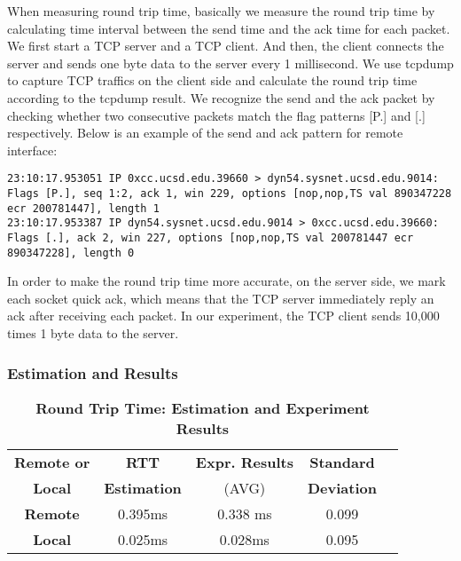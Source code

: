 When measuring round trip time, basically we measure the round trip time by calculating time interval between the send time and the ack time for each packet. We first start a TCP server and a TCP client. And then, the client connects the server and sends one byte data to the server every 1 millisecond. We use tcpdump to capture TCP traffics on the client side and calculate the round trip time according to the tcpdump result.  We recognize the send and the ack packet by checking whether two consecutive packets match the flag patterns [P.] and [.] respectively. Below is an example of the send and ack pattern for remote interface:

\begin{lstlisting}
23:10:17.953051 IP 0xcc.ucsd.edu.39660 > dyn54.sysnet.ucsd.edu.9014: Flags [P.], seq 1:2, ack 1, win 229, options [nop,nop,TS val 890347228 ecr 200781447], length 1
23:10:17.953387 IP dyn54.sysnet.ucsd.edu.9014 > 0xcc.ucsd.edu.39660: Flags [.], ack 2, win 227, options [nop,nop,TS val 200781447 ecr 890347228], length 0
\end{lstlisting}

In order to make the round trip time more accurate, on the server side, we mark each socket quick ack, which means that the TCP server immediately reply an ack after receiving each packet. In our experiment, the TCP client sends 10,000 times 1 byte data to the server.

\subsubsection{Estimation and Results}

\begin{table}[ht]
  \centering
  \caption{\textbf{Round Trip Time: Estimation and Experiment Results}}
  \begin{threeparttable}
  \begin{tabular}{ccccc}
  \hline
      \textbf{Remote or} & \textbf{RTT}   & \textbf{Expr. Results} & \textbf{Standard}\\
      \textbf{Local}   &  \textbf{Estimation}  & (AVG)   & \textbf{Deviation} \\
  \hline
      \textbf{Remote}  & 0.395ms & 0.338 ms & 0.099 \\
      \textbf{Local} & 0.025ms & 0.028ms & 0.095 \\
  \hline
  \end{tabular}
  \end{threeparttable}
  \label{round_trip_time_table}
\end{table}

